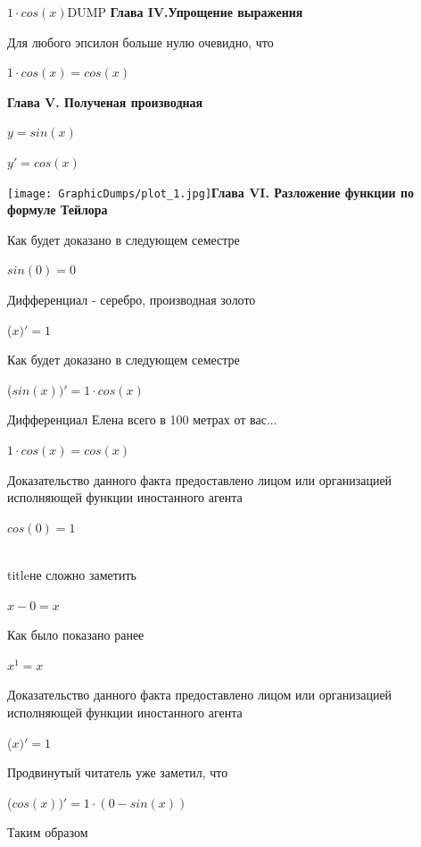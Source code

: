 \documentclass[12pt,a4paper,fleqn]{article}
\begin{document}
$1 \cdot cos(x)$DUMP
\newpage \textbf{\LARGE{Глава IV.Упрощение выражения}}

Для любого эпсилон больше нулю очевидно, что

\begin{center}
$1 \cdot cos(x) = cos(x)$\end{center}
\newpage \textbf{\LARGE{Глава V. Полученая производная}}

$y = $$sin(x)$

$y' = $$cos(x)$

\texttt{[image: GraphicDumps/plot\_1.jpg]}\newpage \textbf{\LARGE{Глава VI. Разложение функции по формуле Тейлора}}

Как будет доказано в следующем семестре

\begin{center}$sin(0) = 0$\end{center}
Дифференциал - серебро, производная золото\cite{link2}

\begin{center}
 ($x)'
  = 1$\end{center}
Как будет доказано в следующем семестре

\begin{center}
 ($sin(x))'
  = 1 \cdot cos(x)$\end{center}
Дифференциал Елена всего в 100 метрах от вас...

\begin{center}
$1 \cdot cos(x) = cos(x)$\end{center}
Доказательство данного факта предоставлено лицом или организацией исполняющей функции иностанного агента

\begin{center}$cos(0) = 1$\end{center}
\\ title{не сложно заметить} 

\begin{center}
$x-0 = x$\end{center}
Как было показано ранее

\begin{center}
$x^{1} = x$\end{center}
Доказательство данного факта предоставлено лицом или организацией исполняющей функции иностанного агента

\begin{center}
 ($x)'
  = 1$\end{center}
Продвинутый читатель уже заметил, что

\begin{center}
 ($cos(x))'
  = 1 \cdot (0-sin(x))$\end{center}
Таким образом
\end{document}
